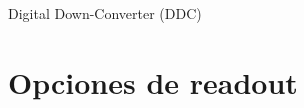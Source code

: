 \documentclass[ignorenonframetext,12pt]{beamer}
\begin{document}
\begin{frame}{Digital Down-Converter (DDC)}
				\begin{center}
				\end{center}
								\begin{center}
								\end{center}
\end{frame}

\section{Opciones de readout}
\end{document}
